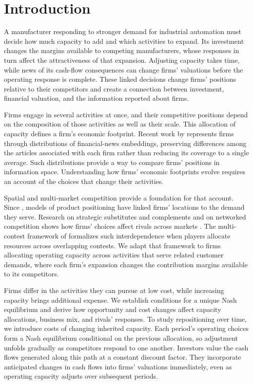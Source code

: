 \section{Introduction}\label{sec:introduction}

A manufacturer responding to stronger demand for industrial automation must
decide how much capacity to add and which activities to expand.
Its investment changes the margins available to competing manufacturers,
whose responses in turn affect the attractiveness of that expansion.
Adjusting capacity takes time, while news of its cash-flow consequences can
change firms' valuations before the operating response is complete.
These linked decisions change firms' positions relative to their competitors
and create a connection between investment, financial valuation, and the
information reported about firms.

Firms engage in several activities at once, and their competitive positions
depend on the composition of those activities as well as their scale.
This allocation of capacity defines a firm's economic footprint.
Recent work by \citet{gawronsky_continuous_2026} represents firms through
distributions of financial-news embeddings, preserving differences among the
articles associated with each firm rather than reducing its coverage to a
single average.
Such distributions provide a way to compare firms' positions in information space.
Understanding how firms' economic footprints evolve requires an account of
the choices that change their activities.

Spatial and multi-market competition provide a foundation for that account.
Since \citet{hotelling_stability_1929}, models of product positioning have
linked firms' locations to the demand they serve.
Research on strategic substitutes and complements and on networked
competition shows how firms' choices affect rivals across markets
\citep{bulow_geanakoplos_klemperer_multimarket_1985,bimpikis_ehsani_ilkilic_cournot_2019}.
The multi-contest framework of \citet{xu_zenou_zhou_conflict_2022} formalizes
such interdependence when players allocate resources across overlapping contests.
We adapt that framework to firms allocating operating capacity across
activities that serve related customer demands, where each firm's expansion
changes the contribution margins available to its competitors.

Firms differ in the activities they can pursue at low cost, while increasing
capacity brings additional expense.
We establish conditions for a unique Nash equilibrium and derive how
opportunity and cost changes affect capacity allocations, business mix, and
rivals' responses.
To study repositioning over time, we introduce costs of changing inherited capacity.
Each period's operating choices form a Nash equilibrium conditional on the
previous allocation, so adjustment unfolds gradually as competitors respond
to one another.
Investors value the cash flows generated along this path at a constant discount factor.
They incorporate anticipated changes in cash flows into firms'
valuations immediately, even as operating capacity adjusts over subsequent
periods.

